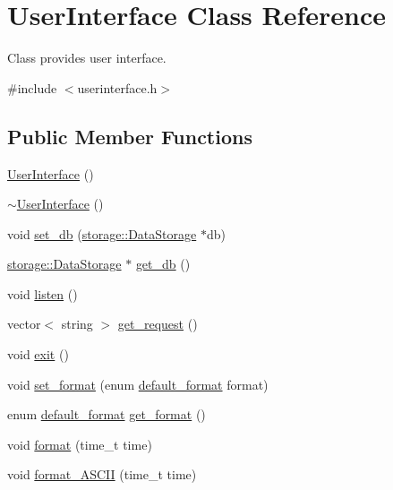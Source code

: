 \hypertarget{classUserInterface}{
\section{UserInterface Class Reference}
\label{df/de1/classUserInterface}
}


Class provides user interface.  




{\ttfamily \#include $<$userinterface.h$>$}

\subsection*{Public Member Functions}
\begin{DoxyCompactItemize}
\item 
\hyperlink{classUserInterface_ae6fb70370701b3bd6120e923df9705b0}{UserInterface} ()
\item 
\hyperlink{classUserInterface_ae588b2ff1711a016dd4c6fc5002c0841}{$\sim$UserInterface} ()
\item 
void \hyperlink{classUserInterface_a8e37eb7afd119929d302b7052746194a}{set\_\-db} (\hyperlink{classstorage_1_1DataStorage}{storage::DataStorage} $\ast$db)
\item 
\hyperlink{classstorage_1_1DataStorage}{storage::DataStorage} $\ast$ \hyperlink{classUserInterface_a3e61736f56a4b5ff2236d061ecad6be4}{get\_\-db} ()
\item 
void \hyperlink{classUserInterface_ac1cead6c14db26f88802ea035fb59bd9}{listen} ()
\item 
vector$<$ string $>$ \hyperlink{classUserInterface_a22fa7e60f82f12920e1627c862f6532e}{get\_\-request} ()
\item 
void \hyperlink{classUserInterface_a396eb29856a6afc91bc0e0eef1de2df7}{exit} ()
\item 
void \hyperlink{classUserInterface_a36513fcf018fafc53726cf610f46571f}{set\_\-format} (enum \hyperlink{userinterface_8h_a5a0e707f53d6c5632b2fb5ffd2d22a11}{default\_\-format} format)
\item 
enum \hyperlink{userinterface_8h_a5a0e707f53d6c5632b2fb5ffd2d22a11}{default\_\-format} \hyperlink{classUserInterface_ad543750a7accc0c4825e02a93fda1909}{get\_\-format} ()
\item 
void \hyperlink{classUserInterface_a9373bc1aedbdc68905942bcb7c6a8fd3}{format} (time\_\-t time)
\item 
void \hyperlink{classUserInterface_a41c109a7e042b44dc98a1250681fc684}{format\_\-ASCII} (time\_\-t time)

\end{DoxyCompactItemize}
